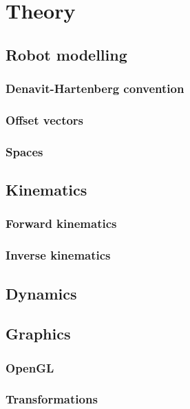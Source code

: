 \chapter{Theory}

\section{Robot modelling}
\lipsum[1]
\subsection{Denavit-Hartenberg convention}
\subsection{Offset vectors}
\subsection{Spaces}

\section{Kinematics}
\lipsum[1]
\subsection{Forward kinematics}
\subsection{Inverse kinematics}

\section{Dynamics}
\lipsum[1]

\section{Graphics}
\lipsum[1]
\subsection{OpenGL}
\subsection{Transformations}